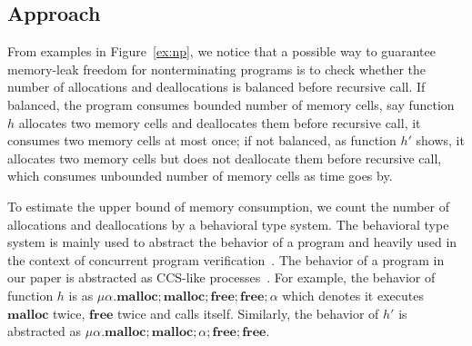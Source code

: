 \documentclass[english]{jssst_ppl} %
\newcommand\Malloc{\mathbf{malloc}}
\newcommand\Free{\mathbf{free}}
\theoremstyle{definition}
\begin{document}


\subsection{Approach}

From examples in Figure~\ref{ex:np}, we notice that a possible way to
guarantee memory-leak freedom for nonterminating programs is to check
whether the number of allocations and deallocations is balanced before
recursive call. If balanced, the program consumes bounded number of
memory cells, say function $h$ allocates two memory cells and
deallocates them before recursive call, it consumes two memory cells
at most once; if not balanced, as function $h'$ shows, it allocates
two memory cells but does not deallocate them before recursive call,
which consumes unbounded number of memory cells as time goes by.

To estimate the upper bound of memory consumption, we count the number
of allocations and deallocations by a behavioral type system. The
behavioral type system is mainly used to abstract the behavior of a
program and heavily used in the context of concurrent program
verification~\cite{DBLP:journals/lmcs/KobayashiSW06,DBLP:journals/tcs/IgarashiK04,DBLP:conf/esop/HondaVK98}. The
behavior of a program in our paper is abstracted as CCS-like
processes~\cite{DBLP:journals/iandc/MilnerPW92a}. For example, the
behavior of function $h$ is as $\mu
\alpha. \Malloc;\Malloc;\Free;\Free;\alpha$ which denotes it executes
$\Malloc$ twice, $\Free$ twice and calls itself. Similarly, the
behavior of $h'$ is abstracted as $\mu
\alpha. \Malloc;\Malloc;\alpha;\Free;\Free$.
\end{document}
